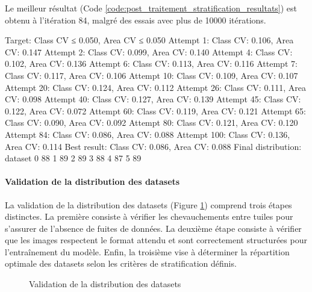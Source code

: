 Le meilleur résultat (Code \ref{code:post_traitement_stratification_resultats}) est obtenu à l'itération 84, malgré des essais avec plus de 10000 itérations.

\begin{code}[H]
    \begin{textcode}
    Target: Class CV ≤ 0.050, Area CV ≤ 0.050
      Attempt 1: Class CV: 0.106, Area CV: 0.147
      Attempt 2: Class CV: 0.099, Area CV: 0.140
      Attempt 4: Class CV: 0.102, Area CV: 0.136
      Attempt 6: Class CV: 0.113, Area CV: 0.116
      Attempt 7: Class CV: 0.117, Area CV: 0.106
      Attempt 10: Class CV: 0.109, Area CV: 0.107
      Attempt 20: Class CV: 0.124, Area CV: 0.112
      Attempt 26: Class CV: 0.111, Area CV: 0.098
      Attempt 40: Class CV: 0.127, Area CV: 0.139
      Attempt 45: Class CV: 0.122, Area CV: 0.072
      Attempt 60: Class CV: 0.119, Area CV: 0.121
      Attempt 65: Class CV: 0.090, Area CV: 0.092
      Attempt 80: Class CV: 0.121, Area CV: 0.120
      Attempt 84: Class CV: 0.086, Area CV: 0.088
      Attempt 100: Class CV: 0.136, Area CV: 0.114
    Best result: Class CV: 0.086, Area CV: 0.088
    Final distribution:
    dataset
    0    88
    1    89
    2    89
    3    88
    4    87
    5    89
    \end{textcode}
    \label{code:post_traitement_stratification_resultats}
\end{code}
    
\newpage
\paragraph{Validation de la distribution des datasets}

La validation de la distribution des datasets (Figure \ref{fig:ch3_postprocessing_dataset_07_validation}) comprend trois étapes distinctes. La première consiste à vérifier les chevauchements entre tuiles pour s'assurer de l'absence de fuites de données. La deuxième étape consiste à vérifier que les images respectent le format attendu et sont correctement structurées pour l'entraînement du modèle. Enfin, la troisième vise à déterminer la répartition optimale des datasets selon les critères de stratification définis.

\begin{figure}[H]
    \centering
    \caption{Validation de la distribution des datasets}
    \label{fig:ch3_postprocessing_dataset_07_validation}
\end{figure}

